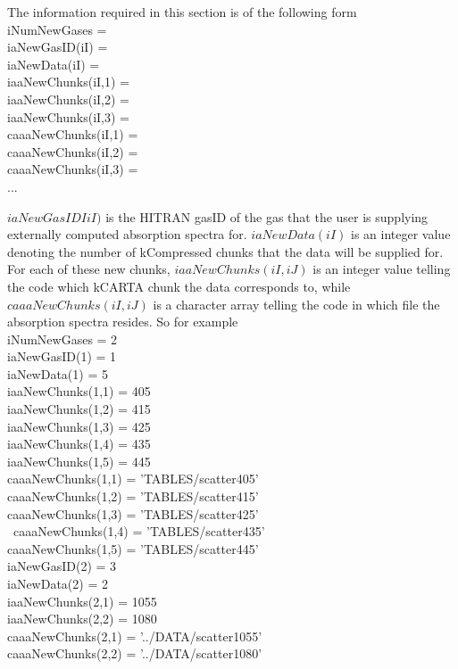 \documentclass[12pt]{article}
\newcommand{\kc}{\textsf{kCARTA}\xspace}
\newcommand{\ttab}{\indent\indent}
\begin{document}
{{The information required in this section is of the following form\\
\medskip
{\sf 
\ttab iNumNewGases   = \\
\ttab iaNewGasID(iI)  = \\
\ttab iaNewData(iI)   = \\ 
\ttab \ttab   iaaNewChunks(iI,1)    =  \\
\ttab \ttab   iaaNewChunks(iI,2)    =  \\
\ttab \ttab   iaaNewChunks(iI,3)    =  \\
\ttab \ttab   caaaNewChunks(iI,1)    =  \\
\ttab \ttab   caaaNewChunks(iI,2)    =  \\
\ttab \ttab   caaaNewChunks(iI,3)    =  \\
\ttab ...\\
\ttab }

$iaNewGasIDIiI)$ is the HITRAN gasID of the gas that the user is supplying 
externally computed absorption spectra for. $iaNewData(iI)$ is an integer 
value denoting the number of kCompressed chunks that the data will be 
supplied for. For each of these new chunks, $iaaNewChunks(iI,iJ)$ 
is an integer value telling the code which \kc chunk the data corresponds to, 
while $caaaNewChunks(iI,iJ)$ is a character array telling the code in which 
file the absorption spectra resides. So for example\\

\medskip
\ttab  iNumNewGases   =             2 \\
\ttab  iaNewGasID(1)  =             1\\
\ttab  iaNewData(1)   =             5\\
\ttab  \ttab iaaNewChunks(1,1)    =           405\\
\ttab  \ttab iaaNewChunks(1,2)    =           415\\
\ttab  \ttab iaaNewChunks(1,3)    =           425\\
\ttab  \ttab iaaNewChunks(1,4)    =           435\\
\ttab  \ttab iaaNewChunks(1,5)    =           445\\
\ttab  \ttab    caaaNewChunks(1,1)     =   'TABLES/scatter405'\\
\ttab  \ttab    caaaNewChunks(1,2)     =   'TABLES/scatter415'\\
\ttab  \ttab    caaaNewChunks(1,3)     =   'TABLES/scatter425'\\\
\ttab  \ttab    caaaNewChunks(1,4)     =   'TABLES/scatter435'\\
\ttab  \ttab    caaaNewChunks(1,5)     =   'TABLES/scatter445'\\
 iaNewGasID(2)  =             3\\
 iaNewData(2)   =             2\\
\ttab  \ttab  iaaNewChunks(2,1)    =           1055 \\
\ttab  \ttab  iaaNewChunks(2,2)    =           1080\\
\ttab  \ttab      caaaNewChunks(2,1)     =   '../DATA/scatter1055'\\
\ttab  \ttab      caaaNewChunks(2,2)     =   '../DATA/scatter1080'\\


}}
\end{document}
